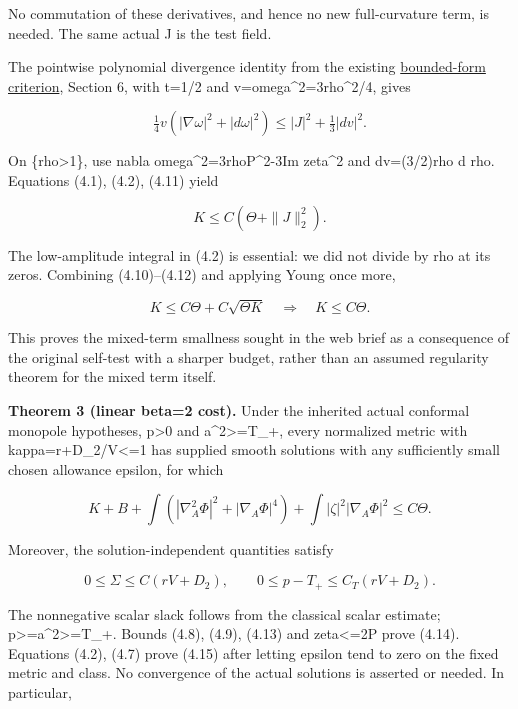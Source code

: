 \documentclass[
  10pt,
]{article}
\begin{document}
No commutation of these derivatives, and hence no new full-curvature
term, is needed. The same actual J is the test field.

The pointwise polynomial divergence identity from the existing
\href{../mathematics/current/round21_analytic.md}{bounded-form
criterion}, Section 6, with t=1/2 and
v=\textbar omega\textbar\^{}2=3rho\^{}2/4, gives

\[
 \tfrac14 v(|\nabla\omega|^2+|d\omega|^2)
       \le |J|^2+\tfrac13|dv|^2.                     \tag{4.11}
\]

On \{rho\textgreater1\}, use \textbar nabla
omega\textbar\^{}2=3rho\textbar P\textbar\^{}2-3\textbar Im
zeta\textbar\^{}2 and dv=(3/2)rho d rho. Equations (4.1), (4.2), (4.11)
yield

\[
                       K\le C(\Theta+\|J\|_2^2).    \tag{4.12}
\]

The low-amplitude integral in (4.2) is essential: we did not divide by
rho at its zeros. Combining (4.10)--(4.12) and applying Young once more,

\[
 K\le C\Theta+C\sqrt{\Theta K}\quad\Longrightarrow\quad
                         \boxed{K\le C\Theta.}       \tag{4.13}
\]

This proves the mixed-term smallness sought in the web brief as a
consequence of the original self-test with a sharper budget, rather than
an assumed regularity theorem for the mixed term itself.

\textbf{Theorem 3 (linear beta=2 cost).} Under the inherited actual
conformal monopole hypotheses, p\textgreater0 and
a\^{}2\textgreater=T\_+, every normalized metric with
kappa=r+D\_2/V\textless=1 has supplied smooth solutions with any
sufficiently small chosen allowance epsilon, for which

\[
 K+B+\int(|\nabla_A^2\Phi|^2+|\nabla_A\Phi|^4)
             +\int|\zeta|^2|\nabla_A\Phi|^2\le C\Theta. 
                                                               \tag{4.14}
\]

Moreover, the solution-independent quantities satisfy

\[
 \boxed{0\le\Sigma\le C(rV+D_2),\qquad
         0\le p-T_+\le C_T(rV+D_2).}                 \tag{4.15}
\]

The nonnegative scalar slack follows from the classical scalar estimate;
p\textgreater=a\^{}2\textgreater=T\_+. Bounds (4.8), (4.9), (4.13) and
\textbar zeta\textbar\textless=2\textbar P\textbar{} prove (4.14).
Equations (4.2), (4.7) prove (4.15) after letting epsilon tend to zero
on the fixed metric and class. No convergence of the actual solutions is
asserted or needed. In particular,
\end{document}
